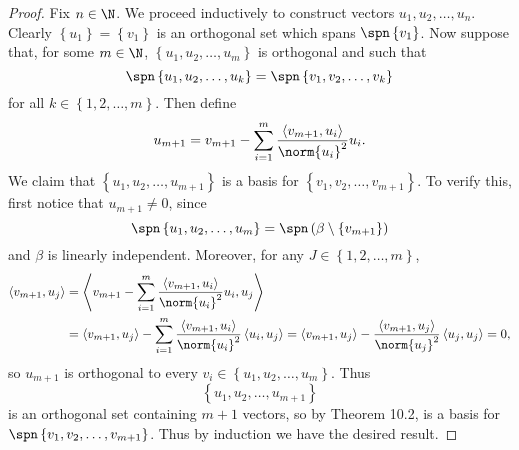 \documentclass[linearalgebra]{subfiles}
\begin{document}
    \begin{proof}
        Fix $n\in\N$. We proceed inductively to construct vectors $u_1,u_2,\ldots,u_n$. Clearly $\left\lbrace u_1 \right\rbrace = \left\lbrace v_1 \right\rbrace $ is an orthogonal set which spans $\spn\left\lbrace v_1 \right\rbrace$. Now suppose that, for some $m\in\N$, $\left\lbrace u_1,u_2,\ldots,u_m \right\rbrace$ is orthogonal and such that
        \begin{equation*}
            \spn\left\lbrace u_1,u_2,\ldots,u_k \right\rbrace = \spn\left\lbrace v_1,v_2,\ldots,v_k \right\rbrace 
        \end{equation*}
        for all $k\in\left\lbrace 1,2,\ldots,m \right\rbrace$. Then define
        \begin{equation*}
            u_{m+1} = v_{m+1} - \sum^{m}_{i=1} \frac{\left\langle v_{m+1}, u_i\right\rangle }{\norm{u_i}^2} u_i.
        \end{equation*}
        We claim that $\left\lbrace u_1,u_2,\ldots,u_{m+1} \right\rbrace$ is a basis for $\left\lbrace v_1,v_2,\ldots,v_{m+1} \right\rbrace$. To verify this, first notice that $u_{m+1}\neq 0$, since
        \begin{equation*}
            \spn\left\lbrace u_1,u_2,\ldots,u_m \right\rbrace = \spn\left( \beta\setminus \left\lbrace v_{m+1} \right\rbrace  \right) 
        \end{equation*}
        and $\beta$ is linearly independent. Moreover, for any $J\in\left\lbrace 1,2,\ldots,m \right\rbrace$,
        \begin{align*}
            \left\langle v_{m+1}, u_j\right\rangle & = \left\langle v_{m+1} - \sum^{m}_{i=1} \frac{\left\langle v_{m+1}, u_i\right\rangle }{\norm{u_i}^2} u_i, u_j\right\rangle \\
                                                   & = \left\langle v_{m+1}, u_j\right\rangle - \sum^{m}_{i=1} \frac{\left\langle v_{m+1}, u_i\right\rangle }{\norm{u_i}^2} \left\langle u_i, u_j\right\rangle = \left\langle v_{m+1}, u_j\right\rangle - \frac{\left\langle v_{m+1}, u_j\right\rangle }{\norm{u_j}^2} \left\langle u_j, u_j\right\rangle = 0,
        \end{align*} 
        so $u_{m+1}$ is orthogonal to every $v_i\in\left\lbrace u_1,u_2,\ldots,u_m \right\rbrace$. Thus
        \begin{equation*}
            \left\lbrace u_1,u_2,\ldots,u_{m+1} \right\rbrace 
        \end{equation*}
        is an orthogonal set containing $m+1$ vectors, so by Theorem 10.2, is a basis for $\spn\left\lbrace v_1,v_2,\ldots,v_{m+1} \right\rbrace$. Thus by induction we have the desired result.
    \end{proof}
\end{document}
